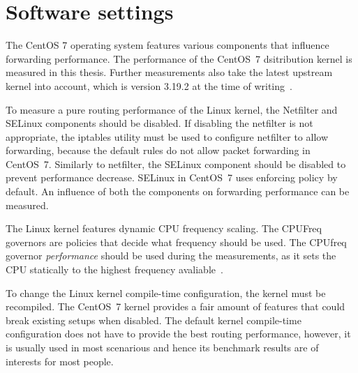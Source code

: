 
\section{Software settings}\label{sec:analysis-settings}
The CentOS 7 operating system features various components that influence forwarding performance.
The performance of the CentOS~7 dsitribution kernel is measured in this thesis.
Further measurements also take the latest upstream kernel into account, which is version
3.19.2 at the time of writing~\cite{kernel-source}.

To measure a pure routing performance of the Linux kernel,
the Netfilter and SELinux components should be disabled.
If disabling the netfilter is not appropriate, the iptables utility must be used to configure netfilter to allow forwarding,
because the default rules do not allow packet forwarding in CentOS~7.
Similarly to netfilter, the SELinux component should be disabled to prevent performance decrease.
SELinux in CentOS~7 uses enforcing policy by default.
An influence of both the components on forwarding performance can be measured.

The Linux kernel features dynamic CPU frequency scaling.
The CPUFreq governors are policies that decide what frequency should be used.
The CPUfreq governor {\it{performance}} should be used during the measurements, as it sets the CPU statically to the
highest frequency avaliable~\cite{cpufreq-governors}. %

To change the Linux kernel compile-time configuration, the kernel must be recompiled.
The CentOS~7 kernel provides a fair amount of features that could break existing setups when disabled.
The default kernel compile-time configuration does not have to provide the best routing performance,
however, it is usually used in most scenarious and hence its benchmark results are of interests for most people.

